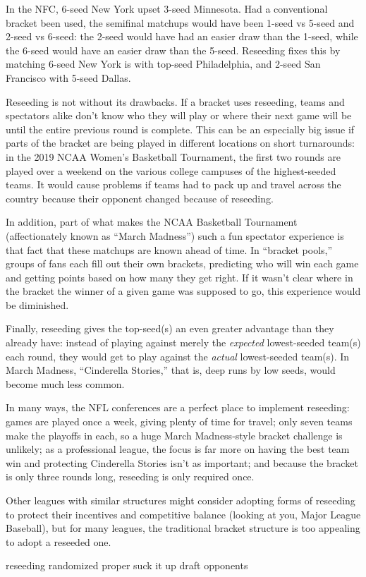{

In the NFC, 6-seed New York upset 3-seed Minnesota. Had a conventional bracket been used, the semifinal matchups would have been 1-seed vs 5-seed and 2-seed vs 6-seed: the 2-seed would have had an easier draw than the 1-seed, while the 6-seed would have an easier draw than the 5-seed. Reseeding fixes this by matching 6-seed New York is with top-seed Philadelphia, and 2-seed San Francisco with 5-seed Dallas.

Reseeding is not without its drawbacks. If a bracket uses reseeding, teams and spectators alike don't know who they will play or where their next game will be until the entire previous round is complete. This can be an especially big issue if parts of the bracket are being played in different locations on short turnarounds: in the 2019 NCAA Women's Basketball Tournament, the first two rounds are played over a weekend on the various college campuses of the highest-seeded teams. It would cause problems if teams had to pack up and travel across the country because their opponent changed because of reseeding.

In addition, part of what makes the NCAA Basketball Tournament (affectionately known as ``March Madness'') such a fun spectator experience is that fact that these matchups are known ahead of time. In ``bracket pools,'' groups of fans each fill out their own brackets, predicting who will win each game and getting points based on how many they get right. If it wasn't clear where in the bracket the winner of a given game was supposed to go, this experience would be diminished.

Finally, reseeding gives the top-seed(s) an even greater advantage than they already have: instead of playing against merely the \textit{expected} lowest-seeded team(s) each round, they would get to play against the \textit{actual} lowest-seeded team(s). In March Madness, ``Cinderella Stories,'' that is, deep runs by low seeds, would become much less common.

In many ways, the NFL conferences are a perfect place to implement reseeding: games are played once a week, giving plenty of time for travel; only seven teams make the playoffs in each, so a huge March Madness-style bracket challenge is unlikely; as a professional league, the focus is far more on having the best team win and protecting Cinderella Stories isn't as important; and because the bracket is only three rounds long, reseeding is only required once.

Other leagues with similar structures might consider adopting forms of reseeding to protect their incentives and competitive balance (looking at you, Major League Baseball), but for many leagues, the traditional bracket structure is too appealing to adopt a reseeded one.



reseeding
randomized proper
suck it up
draft opponents


}